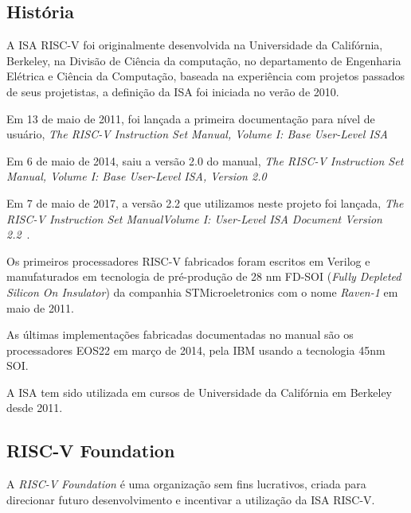 	\subsection{História}%
		A ISA RISC-V foi originalmente desenvolvida na Universidade da Califórnia, Berkeley, na Divisão de Ciência da computação, no departamento de Engenharia Elétrica e Ciência da Computação, baseada na experiência com projetos passados de seus projetistas, a definição da ISA foi iniciada no verão de 2010.\

		Em 13 de maio de 2011, foi lançada a primeira documentação para nível de usuário, \textit{The RISC-V Instruction Set Manual, Volume I: Base User-Level ISA} ~\cite{riscv_manual_v1}

		Em 6 de maio de 2014, saiu a versão 2.0 do manual, \textit{The RISC-V Instruction Set Manual, Volume I: Base User-Level ISA, Version 2.0} ~\cite{riscv_manual_v2}

		Em 7 de maio de 2017, a versão 2.2 que utilizamos neste projeto foi lançada, \textit{The RISC-V Instruction Set ManualVolume I: User-Level ISA Document Version 2.2}~\cite{riscv_spec}.

		Os primeiros processadores RISC-V fabricados foram escritos em Verilog e manufaturados em tecnologia de pré-produção de 28 nm FD-SOI (\textit{Fully Depleted Silicon On Insulator}) da companhia STMicroeletronics com o nome \textit{Raven-1} em maio de 2011.

		As últimas implementações fabricadas documentadas no manual são os processadores EOS22 em março de 2014, pela IBM usando a tecnologia 45nm SOI.

		A ISA tem sido utilizada em cursos de Universidade da Califórnia em Berkeley desde 2011.


	

	\subsection{RISC-V Foundation}
		
		A \textit{RISC-V Foundation} é uma organização sem fins lucrativos, criada para direcionar futuro desenvolvimento e incentivar a utilização da ISA RISC-V.\ ~\cite{riscv_foundation} 

